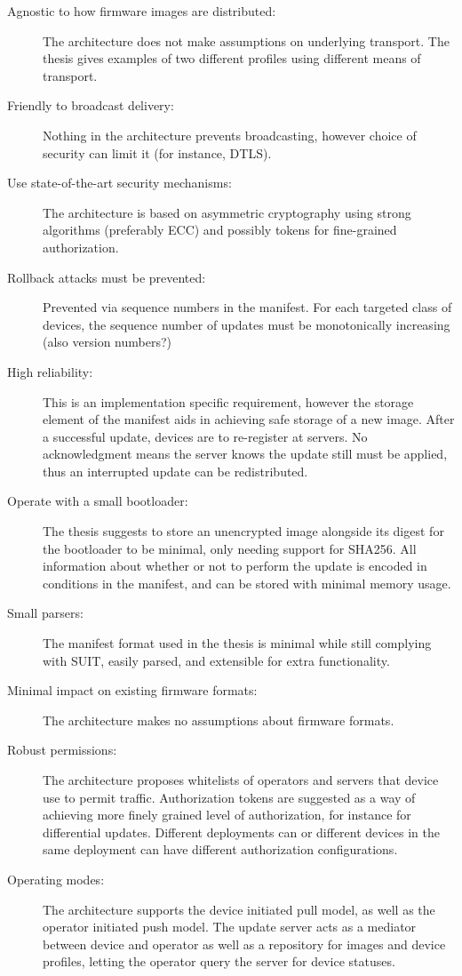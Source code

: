 \documentclass[0-thesis.tex]{subfiles}
\begin{document}
\begin{description}
    \item[Agnostic to how firmware images are distributed:]
        The architecture does not make assumptions on underlying transport. The thesis
        gives examples of two different profiles using different means of transport.
    \item[Friendly to broadcast delivery:]
        Nothing in the architecture prevents broadcasting, however choice of security can
        limit it (for instance, DTLS).
    \item[Use state-of-the-art security mechanisms:]
        The architecture is based on asymmetric cryptography using strong algorithms
        (preferably ECC) and possibly tokens for fine-grained authorization. 
    \item[Rollback attacks must be prevented:]
        Prevented via sequence numbers in the manifest. For each targeted class of
        devices, the sequence number of updates must be monotonically increasing (also
        version numbers?)
    \item[High reliability:]
        This is an implementation specific requirement, however the storage element of the
        manifest aids in achieving safe storage of a new image. After a successful update,
        devices are to re-register at servers. No acknowledgment means the server knows
        the update still must be applied, thus an interrupted update can be redistributed.
    \item[Operate with a small bootloader:]
        The thesis suggests to store an unencrypted image alongside its digest for the
        bootloader to be minimal, only needing support for SHA256. All information about
        whether or not to perform the update is encoded in conditions in the manifest, and
        can be stored with minimal memory usage.  
    \item[Small parsers:]
        The manifest format used in the thesis is minimal while still complying with SUIT,
        easily parsed, and extensible for extra functionality.
    \item[Minimal impact on existing firmware formats:]
        The architecture makes no assumptions about firmware formats.
    \item[Robust permissions:]
        The architecture proposes whitelists of operators and servers that device use to
        permit traffic. Authorization tokens are suggested as a way of achieving more
        finely grained level of authorization, for instance for differential updates.
        Different deployments can or different devices in the same deployment can have
        different authorization configurations.
    \item[Operating modes:]
        The architecture supports the device initiated pull model, as well as the operator
        initiated push model. The update server acts as a mediator between device and
        operator as well as a repository for images and device profiles, letting the
        operator query the server for device statuses.
\end{description}
\end{document}
